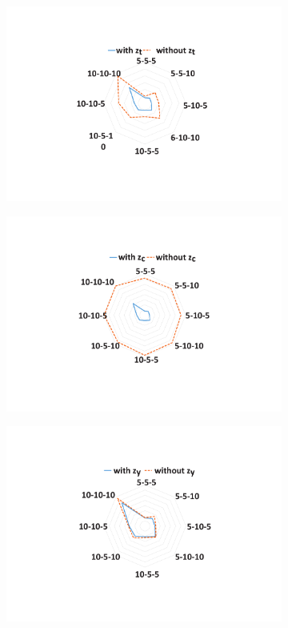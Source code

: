 \documentclass[letterpaper]{article} %
\begin{document}
\begin{figure}[!t]
	\centering
	\begin{subfigure}{0.15\textwidth}
		\includegraphics[width = \linewidth]{z_t2.pdf}
		\caption{}
	\end{subfigure}
		\begin{subfigure}{0.15\textwidth}
			\includegraphics[width = \linewidth]{z_c2.pdf}
			\caption{}
		\end{subfigure}
	\begin{subfigure}{0.15\textwidth}
		\includegraphics[width = \linewidth]{z_y2.pdf}

\end{subfigure}
\end{figure}
\end{document}

